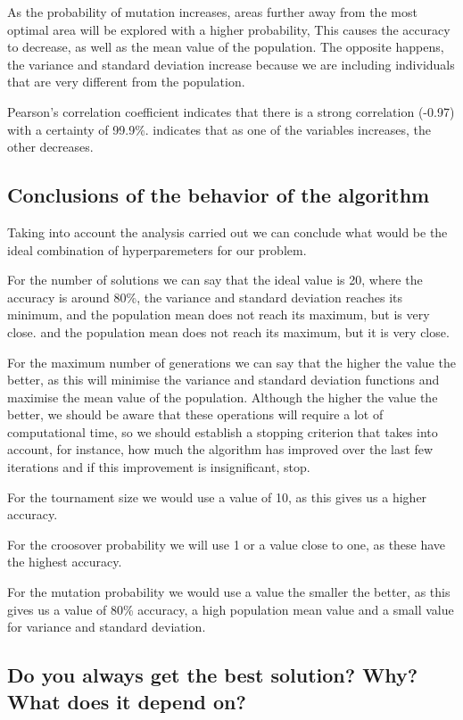\documentclass{article}
\begin{document}
    As the probability of mutation increases, areas further away from the most optimal area will be explored with a higher probability,
    This causes the accuracy to decrease, as well as the mean value of the population.
    The opposite happens, the variance and standard deviation increase because we are including individuals that are very different from the population.

    Pearson's correlation coefficient indicates that there is a strong correlation (-0.97) with a certainty of 99.9\%.
    indicates that as one of the variables increases, the other decreases.
        
    \subsection{Conclusions of the behavior of the algorithm}

    Taking into account the analysis carried out we can conclude what would be the ideal combination of hyperparemeters for our problem.

    For the number of solutions we can say that the ideal value is 20, where the accuracy is around 80\%, the variance and standard deviation reaches its minimum, and the population mean does not reach its maximum, but is very close.
    and the population mean does not reach its maximum, but it is very close.

    For the maximum number of generations we can say that the higher the value the better, as this will minimise the variance and standard deviation functions and maximise the mean value of the population. 
    Although the higher the value the better, we should be aware that these operations will require a lot of computational time, so we should establish a stopping criterion
    that takes into account, for instance, how much the algorithm has improved over the last few iterations and if this improvement is insignificant, stop.

    For the tournament size we would use a value of 10, as this gives us a higher accuracy.
    
    For the croosover probability we will use 1 or a value close to one, as these have the highest accuracy.

    For the mutation probability we would use a value the smaller the better, as this gives us a value of 80\% accuracy, a high population mean value and a small value for variance and standard deviation.


    \subsection{Do you always get the best solution? Why? What does it depend on?}
\end{document}
